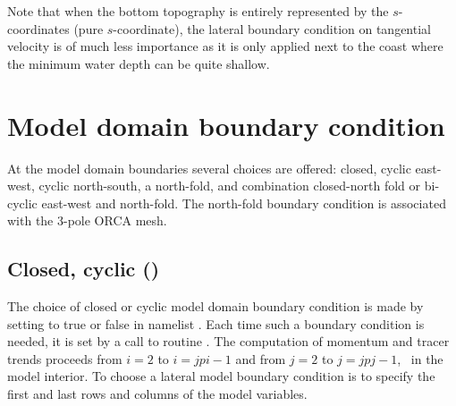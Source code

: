 \documentclass[../main/NEMO_manual]{subfiles}
\begin{document}
Note that when the bottom topography is entirely represented by the $s$-coordinates (pure $s$-coordinate),
the lateral boundary condition on tangential velocity is of much less importance as
it is only applied next to the coast where the minimum water depth can be quite shallow.

\section{Model domain boundary condition}
\label{sec:LBC_jperio}

At the model domain boundaries several choices are offered:
closed, cyclic east-west, cyclic north-south, a north-fold, and combination closed-north fold or
bi-cyclic east-west and north-fold.
The north-fold boundary condition is associated with the 3-pole ORCA mesh.

\subsection{Closed, cyclic ()}
\label{subsec:LBC_jperio012}

The choice of closed or cyclic model domain boundary condition is made by
setting  to true or false in namelist .
Each time such a boundary condition is needed, it is set by a call to routine .
The computation of momentum and tracer trends proceeds from $i=2$ to $i=jpi-1$ and from $j=2$ to $j=jpj-1$,
\ie\ in the model interior.
To choose a lateral model boundary condition is to specify the first and last rows and columns of
the model variables.
\end{document}
